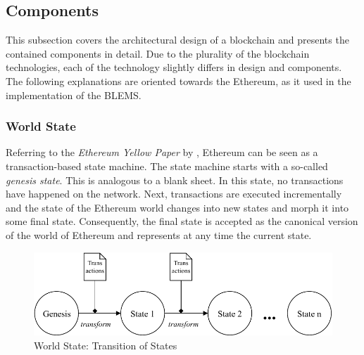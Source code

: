 \subsection{Components}
This subsection covers the architectural design of a blockchain and presents the 
contained components in detail. Due to the plurality of the blockchain technologies, 
each of the technology slightly differs in design and components. 
The following explanations are oriented towards the Ethereum, as it used 
in the implementation of the BLEMS.

\subsubsection{World State}
\label{sec:world_state}
Referring to the \textit{Ethereum Yellow Paper} by , Ethereum 
can be seen as a transaction-based state machine.
The state machine starts with a so-called 
\textit{genesis state}. This is analogous to a blank sheet. 
In this state, no transactions have happened on the network. 
Next, transactions are executed incrementally and the state of the Ethereum world 
changes into new states and morph it into some final state. 
Consequently, the final state 
is accepted as the canonical version of the world of Ethereum and 
represents at any time the current state.

\begin{figure}[htbp]
	\centering
	\includegraphics[width=.75\linewidth]{./figures/state_transition.pdf}
	\caption{World State: Transition of States}
	\label{figure:state_transition}
\end{figure}

